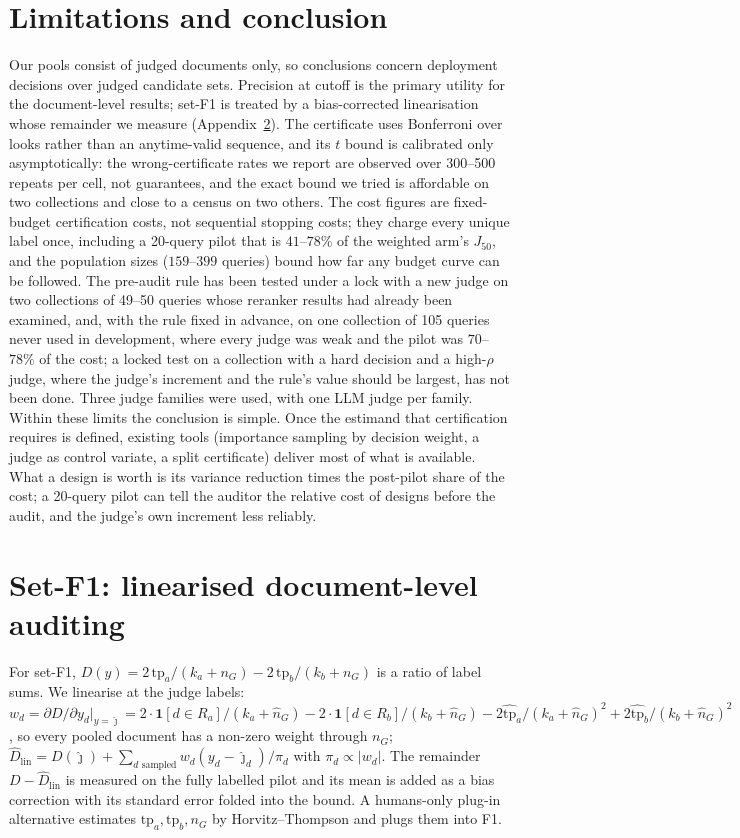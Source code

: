 \documentclass{article}
\newcommand{\Jfifty}{J_{50}}
\begin{document}
\section{Limitations and conclusion}
Our pools consist of judged documents only, so conclusions concern deployment decisions over judged candidate sets. Precision at cutoff is the primary utility for the document-level results; set-F1 is treated by a bias-corrected linearisation whose remainder we measure (Appendix~\ref{app:f1}). The certificate uses Bonferroni over looks rather than an anytime-valid sequence, and its $t$ bound is calibrated only asymptotically: the wrong-certificate rates we report are observed over 300--500 repeats per cell, not guarantees, and the exact bound we tried is affordable on two collections and close to a census on two others. The cost figures are fixed-budget certification costs, not sequential stopping costs; they charge every unique label once, including a 20-query pilot that is $41$--$78\%$ of the weighted arm's $\Jfifty$, and the population sizes ($159$--$399$ queries) bound how far any budget curve can be followed. The pre-audit rule has been tested under a lock with a new judge on two collections of 49--50 queries whose reranker results had already been examined, and, with the rule fixed in advance, on one collection of 105 queries never used in development, where every judge was weak and the pilot was $70$--$78\%$ of the cost; a locked test on a collection with a hard decision and a high-$\rho$ judge, where the judge's increment and the rule's value should be largest, has not been done. Three judge families were used, with one LLM judge per family. Within these limits the conclusion is simple. Once the estimand that certification requires is defined, existing tools (importance sampling by decision weight, a judge as control variate, a split certificate) deliver most of what is available. What a design is worth is its variance reduction times the post-pilot share of the cost; a 20-query pilot can tell the auditor the relative cost of designs before the audit, and the judge's own increment less reliably.




\appendix
\section{Set-F1: linearised document-level auditing}\label{app:f1}
For set-F1, $D(y)=2\,\mathrm{tp}_a/(k_a+n_G)-2\,\mathrm{tp}_b/(k_b+n_G)$ is a ratio of label sums. We linearise at the judge labels: $w_d=\partial D/\partial y_d|_{y=\hat\jmath}=2\cdot\mathbf 1[d\in R_a]/(k_a+\hat n_G)-2\cdot\mathbf 1[d\in R_b]/(k_b+\hat n_G)-2\hat{\mathrm{tp}}_a/(k_a+\hat n_G)^2+2\hat{\mathrm{tp}}_b/(k_b+\hat n_G)^2$, so every pooled document has a non-zero weight through $n_G$; $\hat D_{\mathrm{lin}}=D(\hat\jmath)+\sum_{d\text{ sampled}}w_d(y_d-\hat\jmath_d)/\pi_d$ with $\pi_d\propto|w_d|$. The remainder $D-\hat D_{\mathrm{lin}}$ is measured on the fully labelled pilot and its mean is added as a bias correction with its standard error folded into the bound. A humans-only plug-in alternative estimates $\mathrm{tp}_a,\mathrm{tp}_b,n_G$ by Horvitz--Thompson and plugs them into F1.
\end{document}
